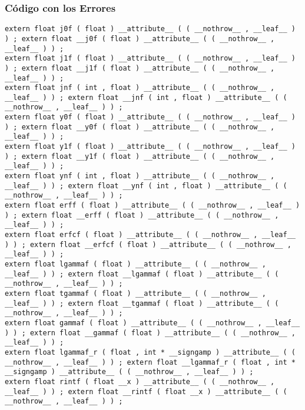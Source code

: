 \documentclass{beamer}
\begin{document}
\begin{frame}[fragile]
\frametitle{C\'odigo con los Errores}
\begin{verbatim}
extern float j0f ( float ) __attribute__ ( ( __nothrow__ , __leaf__ ) ) ; extern float __j0f ( float ) __attribute__ ( ( __nothrow__ , __leaf__ ) ) ; 
extern float j1f ( float ) __attribute__ ( ( __nothrow__ , __leaf__ ) ) ; extern float __j1f ( float ) __attribute__ ( ( __nothrow__ , __leaf__ ) ) ; 
extern float jnf ( int , float ) __attribute__ ( ( __nothrow__ , __leaf__ ) ) ; extern float __jnf ( int , float ) __attribute__ ( ( __nothrow__ , __leaf__ ) ) ; 
extern float y0f ( float ) __attribute__ ( ( __nothrow__ , __leaf__ ) ) ; extern float __y0f ( float ) __attribute__ ( ( __nothrow__ , __leaf__ ) ) ; 
extern float y1f ( float ) __attribute__ ( ( __nothrow__ , __leaf__ ) ) ; extern float __y1f ( float ) __attribute__ ( ( __nothrow__ , __leaf__ ) ) ; 
extern float ynf ( int , float ) __attribute__ ( ( __nothrow__ , __leaf__ ) ) ; extern float __ynf ( int , float ) __attribute__ ( ( __nothrow__ , __leaf__ ) ) ; 
extern float erff ( float ) __attribute__ ( ( __nothrow__ , __leaf__ ) ) ; extern float __erff ( float ) __attribute__ ( ( __nothrow__ , __leaf__ ) ) ; 
extern float erfcf ( float ) __attribute__ ( ( __nothrow__ , __leaf__ ) ) ; extern float __erfcf ( float ) __attribute__ ( ( __nothrow__ , __leaf__ ) ) ; 
extern float lgammaf ( float ) __attribute__ ( ( __nothrow__ , __leaf__ ) ) ; extern float __lgammaf ( float ) __attribute__ ( ( __nothrow__ , __leaf__ ) ) ; 
extern float tgammaf ( float ) __attribute__ ( ( __nothrow__ , __leaf__ ) ) ; extern float __tgammaf ( float ) __attribute__ ( ( __nothrow__ , __leaf__ ) ) ; 
extern float gammaf ( float ) __attribute__ ( ( __nothrow__ , __leaf__ ) ) ; extern float __gammaf ( float ) __attribute__ ( ( __nothrow__ , __leaf__ ) ) ; 
extern float lgammaf_r ( float , int * __signgamp ) __attribute__ ( ( __nothrow__ , __leaf__ ) ) ; extern float __lgammaf_r ( float , int * __signgamp ) __attribute__ ( ( __nothrow__ , __leaf__ ) ) ; 
extern float rintf ( float __x ) __attribute__ ( ( __nothrow__ , __leaf__ ) ) ; extern float __rintf ( float __x ) __attribute__ ( ( __nothrow__ , __leaf__ ) ) ; 
\end{verbatim}
\end{frame}
\end{document}
